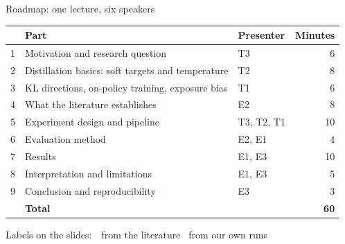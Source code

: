 \begin{frame}{Roadmap: one lecture, six speakers\hfill{}}
  \centering\small
  \begin{tabular}{@{}r l l r@{}}
    \toprule
    & Part & Presenter & Minutes \\
    \midrule
    1 & Motivation and research question & T3 & 6 \\
    2 & Distillation basics: soft targets and temperature & T2 & 8 \\
    3 & KL directions, on-policy training, exposure bias & T1 & 6 \\
    4 & What the literature establishes & E2 & 8 \\
    5 & Experiment design and pipeline & T3, T2, T1 & 10 \\
    6 & Evaluation method & E2, E1 & 4 \\
    7 & Results & E1, E3 & 10 \\
    8 & Interpretation and limitations & E1, E3 & 5 \\
    9 & Conclusion and reproducibility & E3 & 3 \\
    \midrule
      & \textbf{Total} & & \textbf{60} \\
    \bottomrule
  \end{tabular}

  \vspace{0.25cm}
  {\scriptsize\color{kdgray} Labels on the slides:\ \est\ from the literature \quad \ours\ from our own runs}
\end{frame}
